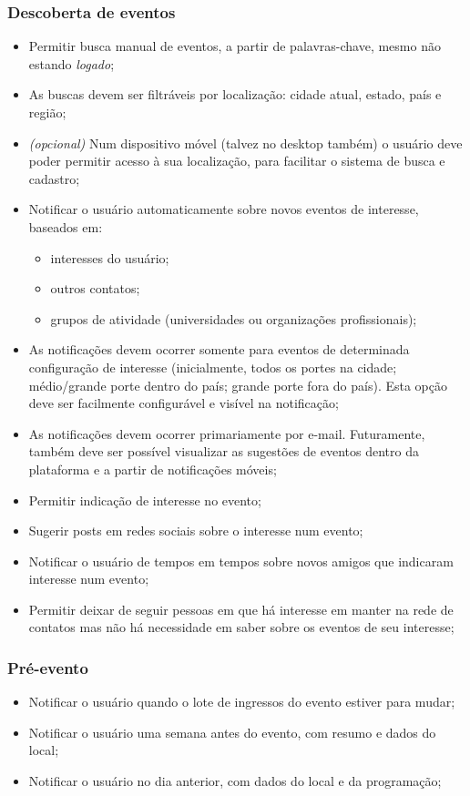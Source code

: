 \documentclass[12pt,a4paper,twoside,hyphens,english,brazil]{abntex2}
\begin{document}
\subsubsection*{Descoberta de eventos}
\begin{itemize}
	\item Permitir busca manual de eventos, a partir de palavras-chave, mesmo não estando \textit{logado};
	\item As buscas devem ser filtráveis por localização: cidade atual, estado, país e região;
	\item \emph{(opcional)} Num dispositivo móvel (talvez no desktop também) o usuário deve poder permitir acesso à sua localização, para facilitar o sistema de busca e cadastro;
	\item Notificar o usuário automaticamente sobre novos eventos de interesse, baseados em:
		\begin{itemize}
			\item interesses do usuário;
			\item outros contatos;
			\item grupos de atividade (universidades ou organizações profissionais);
		\end{itemize}
	\item As notificações devem ocorrer somente para eventos de determinada configuração de interesse (inicialmente, todos os portes na cidade; médio/grande porte dentro do país; grande porte fora do país). Esta opção deve ser facilmente configurável e visível na notificação;
	\item As notificações devem ocorrer primariamente por e-mail. Futuramente, também deve ser possível visualizar as sugestões de eventos dentro da plataforma e a partir de notificações móveis;
	\item Permitir indicação de interesse no evento;
	\item Sugerir posts em redes sociais sobre o interesse num evento;
	\item Notificar o usuário de tempos em tempos sobre novos amigos que indicaram interesse num evento;
	\item Permitir deixar de seguir pessoas em que há interesse em manter na rede de contatos mas não há necessidade em saber sobre os eventos de seu interesse;
\end{itemize}

\subsubsection*{Pré-evento}
\begin{itemize}
	\item Notificar o usuário quando o lote de ingressos do evento estiver para mudar;
	\item Notificar o usuário uma semana antes do evento, com resumo e dados do local;
	\item Notificar o usuário no dia anterior, com dados do local e da programação;
\end{itemize}
\end{document}
